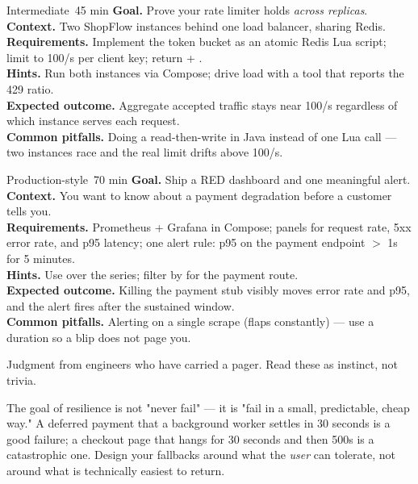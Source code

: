 \begin{minilab}{Intermediate}{~45 min}
\textbf{Goal.} Prove your rate limiter holds \emph{across replicas}.\\
\textbf{Context.} Two ShopFlow instances behind one load balancer, sharing Redis.\\
\textbf{Requirements.} Implement the token bucket as an atomic Redis Lua script; limit to 100/s per client key; return  + .\\
\textbf{Hints.} Run both instances via Compose; drive load with a tool that reports the 429 ratio.\\
\textbf{Expected outcome.} Aggregate accepted traffic stays near 100/s regardless of which instance serves each request.\\
\textbf{Common pitfalls.} Doing a read-then-write in Java instead of one Lua call --- two instances race and the real limit drifts above 100/s.
\end{minilab}

\begin{minilab}{Production-style}{~70 min}
\textbf{Goal.} Ship a RED dashboard and one meaningful alert.\\
\textbf{Context.} You want to know about a payment degradation before a customer tells you.\\
\textbf{Requirements.} Prometheus + Grafana in Compose; panels for request rate, 5xx error rate, and p95 latency; one alert rule: p95 on the payment endpoint $>$ 1s for 5 minutes.\\
\textbf{Hints.} Use  over the  series; filter by  for the payment route.\\
\textbf{Expected outcome.} Killing the payment stub visibly moves error rate and p95, and the alert fires after the sustained window.\\
\textbf{Common pitfalls.} Alerting on a single scrape (flaps constantly) --- use a  duration so a blip does not page you.
\end{minilab}


Judgment from engineers who have carried a pager. Read these as instinct, not trivia.

\begin{seniornote}
The goal of resilience is not "never fail" --- it is "fail in a small, predictable, cheap way." A deferred payment that a background worker settles in 30 seconds is a good failure; a checkout page that hangs for 30 seconds and then 500s is a catastrophic one. Design your fallbacks around what the \emph{user} can tolerate, not around what is technically easiest to return.
\end{seniornote}

